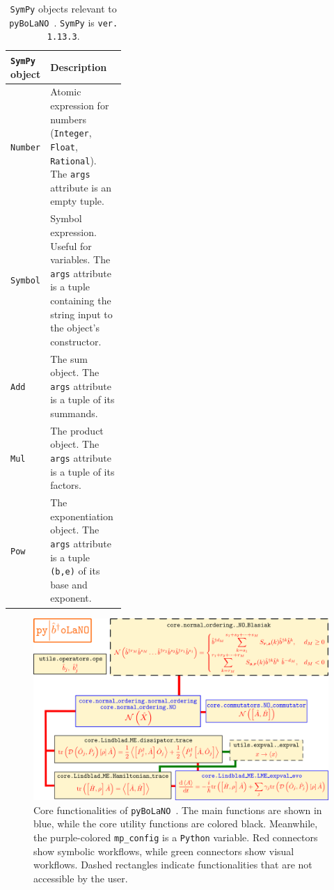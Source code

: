 \documentclass[onecolumn, 12pt, sort&compress]{elsarticle}
\newcounter{bla}
\newcommand{\inlinecode}[1]{\texttt{#1}}
\newcommand{\pybolano}{\texttt{pyBoLaNO}~}
\newenvironment{revision}{}{}
\begin{document}
\begin{table}[!t]
\centering

\caption{\texttt{SymPy} objects \begin{revision}relevant to\end{revision} \pybolano. \texttt{SymPy} is \inlinecode{ver. 1.13.3}.}

\begin{tabular}{p{0.33\linewidth}|>{\raggedright\arraybackslash}p{}}
    \hline
    \hline
        \texttt{SymPy} object 
        & 
        Description
    \\
    \hline
    \hline
        \inlinecode{Number}
        &
        Atomic expression for numbers (\inlinecode{Integer}, \inlinecode{Float}, \inlinecode{Rational}). The \inlinecode{args} attribute is an empty tuple.
    \\
    \hline
        \inlinecode{Symbol}
        &
        Symbol expression. Useful for variables. The \inlinecode{args} attribute is a tuple containing the string input to the object's constructor.
    \\
    \hline
        \inlinecode{Add}
        &
        The sum object. The \inlinecode{args} attribute is a tuple of its summands.
    \\
    \hline
        \inlinecode{Mul}
        &
        The product object. The \inlinecode{args} attribute is a tuple of its factors.
    \\
    \hline
        \inlinecode{Pow}
        &
        The exponentiation object. The \inlinecode{args} attribute is a tuple \inlinecode{(b,e)} of its base and exponent.
    \\
    \hline
    \hline
\end{tabular}
\label{table_1}
\end{table}

\begin{figure}[!t]
    \centering
    \includegraphics[width=0.8\linewidth]{fig_1.png}
    \caption{Core functionalities of \pybolano. The main functions are shown in blue, while the core utility functions are colored black. Meanwhile, the purple-colored \inlinecode{mp_config} is a \texttt{Python} variable. Red connectors show symbolic workflows, while green connectors show visual workflows. Dashed rectangles indicate functionalities that are not accessible by the user.}
    \label{fig_1}
\end{figure}
\end{document}
